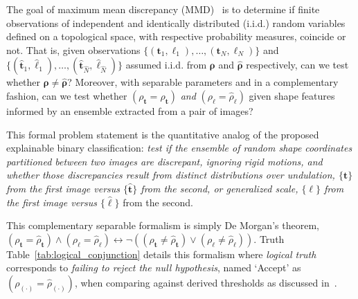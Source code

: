\documentclass[pdflatex,iicol]{sn-jnl}%
\theoremstyle{thmstyleone}%
\theoremstyle{thmstyletwo}%
\theoremstyle{thmstylethree}%
\begin{document}
The goal of maximum mean discrepancy (MMD)~\cite{fortet1953convergence,gretton2012kernel} is to determine if finite observations of independent and identically distributed (i.i.d.) random variables defined on a topological space, with respective probability measures, coincide or not. That is, given observations $\lbrace (\boldsymbol{t}_1, \boldsymbol{\ell}_1),\dots,(\boldsymbol{t}_N, \boldsymbol{\ell}_N)\rbrace$ and $\lbrace (\widehat{\boldsymbol{t}}_1, \widehat{\boldsymbol{\ell}}_1),\dots,(\widehat{\boldsymbol{t}}_{\widehat{N}}, \widehat{\boldsymbol{\ell}}_{\widehat{N}}) \rbrace$ assumed i.i.d. from $\boldsymbol{\rho}$ and $\widehat{\boldsymbol{\rho}}$ respectively, can we test whether $\boldsymbol{\rho} \neq \widehat{\boldsymbol{\rho}}$? Moreover, with separable parameters and in a complementary fashion, can we test whether $(\rho_{\boldsymbol{t}} = \widehat{\rho}_{\boldsymbol{t}})$ \emph{and} $(\rho_{\boldsymbol{\ell}} = \widehat{\rho}_{\boldsymbol{\ell}})$ given shape features informed by an ensemble extracted from a pair of images? 

This formal problem statement is the quantitative analog of the proposed explainable binary classification: \textit{test if the ensemble of random shape coordinates partitioned between two images are discrepant, ignoring rigid motions, and whether those discrepancies result from distinct distributions over undulation, $\lbrace \boldsymbol{t} \rbrace$ from the first image versus $\lbrace \widehat{\boldsymbol{t}} \rbrace$ from the second, \emph{or} generalized scale, $\lbrace \boldsymbol{\ell} \rbrace$ from the first image versus $\lbrace \widehat{\boldsymbol{\ell}} \rbrace$} from the second.

This complementary separable formalism is simply De Morgan's theorem, $(\rho_{\boldsymbol{t}} = \widehat{\rho}_{\boldsymbol{t}})\wedge (\rho_{\boldsymbol{\ell}} = \widehat{\rho}_{\boldsymbol{\ell}}) \leftrightarrow \neg ((\rho_{\boldsymbol{t}} \neq \widehat{\rho}_{\boldsymbol{t}}) \vee (\rho_{\boldsymbol{\ell}} \neq \widehat{\rho}_{\boldsymbol{\ell}}))$. Truth Table~\ref{tab:logical_conjunction} details this formalism where \textit{logical truth} corresponds to \textit{failing to reject the null hypothesis}, named `Accept' as $(\rho_{(\cdot)} = \widehat{\rho}_{(\cdot)})$, when comparing against derived thresholds as discussed in~\cite{gretton2012kernel}.
\end{document}
